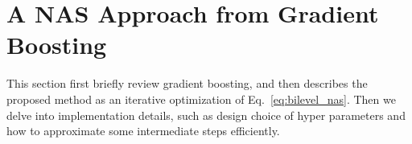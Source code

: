 




\section{A NAS Approach from Gradient Boosting}


This section first briefly review gradient boosting, and 
then describes the proposed method as an iterative optimization of Eq.~\ref{eq:bilevel_nas}. 
Then we delve into implementation details, such as design choice of hyper parameters and 
how to approximate some intermediate steps efficiently.


